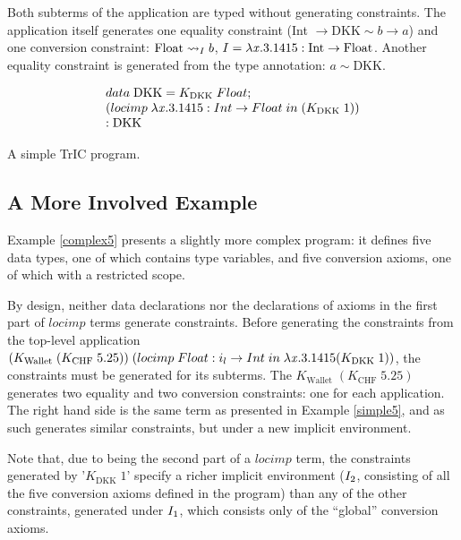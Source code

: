 Both subterms of the application are typed without generating constraints. The application itself generates one equality constraint (Int $\to \text{DKK} \sim b \to a$) and one conversion constraint: $\convX{\imEnv}{\text{Float}}{b}$, $\imEnv = \lambda \tmVar.3.1415 : \text{Int} \to \text{Float}$. Another equality constraint is generated from the type annotation: $a \sim \text{DKK}$.

\begin{eg}
     \[
\begin{array}{@{\hspace{0mm}}l@{\hspace{0mm}}}
  data\;\text{DKK}=K_{\text{DKK}}\;Float;\\
  (\monolocal{Int}{Float}{\lambda \tmVar.3.1415} (K_{\text{DKK}}\;1))\\
  : \text{DKK}
\end{array}
\]

\caption{A simple TrIC program.}
\label{simple5}
\end{eg}
\subsection{A More Involved Example}
Example \ref{complex5} presents a slightly more complex program: it defines five data types, one of which contains type variables, and five conversion axioms, one of which with a restricted scope.

By design, neither data declarations nor the declarations of axioms in the first part of $locimp$ terms generate constraints. Before generating the constraints from the top-level application $(K_{\text{Wallet}}\;(K_{\text{CHF}}\; 5.25)) \;(\monolocal{i_l}{Int}{Float}{\lambda \tmVar.3.1415} (K_{\text{DKK}}\;1))$, the constraints must be generated for its subterms. The $K_{\text{Wallet}}\;(K_{\text{CHF}}\; 5.25)$ generates two equality and two conversion constraints: one for each application. The right hand side is the same term as presented in Example \ref{simple5}, and as such generates similar constraints, but under a new implicit environment.

Note that, due to being the second part of a $locimp$ term, the constraints generated by '$K_{\text{DKK}}\;1$' specify a richer implicit environment ($\imEnv_2$, consisting of all the five conversion axioms defined in the program) than any of the other constraints, generated under $\imEnv_1$, which consists only of the ``global'' conversion axioms.

